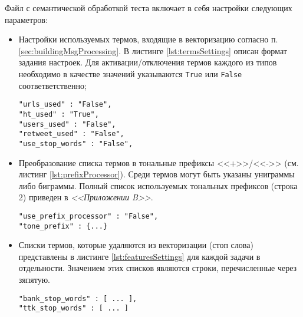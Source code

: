     Файл с семантической обработкой теста включает в себя настройки следующих
    параметров:
    \begin{itemize}
        \item Настройки используемых термов, входящие в векторизацию согласно
            п. \ref{sec:buildingMsgProcessing}. В листинге \ref{lst:termsSettings}
            описан формат задания настроек. Для активации/отключения термов
            каждого из типов необходимо в качестве значений указываются {\tt True}
            или {\tt False} соответветственно;

            \begin{lstlisting}[caption="Указание используемых в векторизации термов", label={lst:termsSettings}]
"urls_used" : "False",
"ht_used" : "True",
"users_used" : "False",
"retweet_used" : "False",
"use_stop_words" : "False",
            \end{lstlisting}

        \item Преобразование списка термов в тональные префиксы <<+>>/<<->> (см. листинг \ref{lst:prefixProcessor}).
            Среди термов могут быть указаны униграммы либо биграммы. Полный список
            используемых тональных префиксов (строка 2) приведен в {\it <<Приложении B>>}.
            \begin{lstlisting}[caption="Настройка преобразования термов в тональные префиксы", label={lst:prefixProcessor}]
"use_prefix_processor" : "False",
"tone_prefix" : {...}
            \end{lstlisting}
        \item Списки термов, которые удаляются из векторизации (стоп слова)
            представлены в листинге \ref{lst:featuresSettings} для каждой задачи в отдельности.
            Значением этих списков являются строки, перечисленные через зяпятую.

            \begin{lstlisting}[caption="Настройка используемых списков стоп слов", label={lst:featuresSettings}]
"bank_stop_words" : [ ... ],
"ttk_stop_words" : [ ... ]
            \end{lstlisting}
    \end{itemize}

